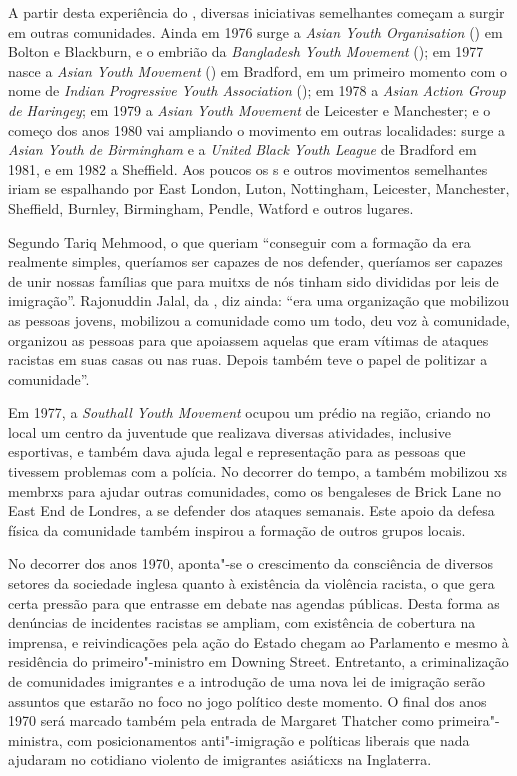 A partir desta experiência do , diversas iniciativas semelhantes começam a surgir em outras comunidades. Ainda em 1976 surge a \emph{Asian Youth Organisation} () em Bolton e Blackburn, e o embrião da \emph{Bangladesh Youth Movement} (); em 1977 nasce a \emph{Asian Youth Movement} () em Bradford, em um primeiro momento com o nome de \emph{Indian Progressive Youth Association} (); em 1978 a \emph{Asian Action Group de Haringey}; em 1979 a \emph{Asian Youth Movement} de Leicester e Manchester; e o começo dos anos 1980 vai ampliando o movimento em outras localidades: surge a \emph{Asian Youth de Birmingham} e a \emph{United Black Youth League} de Bradford em 1981, e em 1982 a  Sheffield. Aos poucos os s e outros movimentos semelhantes iriam se espalhando por East London, Luton, Nottingham, Leicester, Manchester, Sheffield, Burnley, Birmingham, Pendle, Watford e outros lugares.

Segundo Tariq Mehmood, o que queriam ``conseguir com a formação da  era realmente simples, queríamos ser capazes de nos defender, queríamos ser capazes de unir nossas famílias que para muitxs de nós tinham sido divididas por leis de imigração''. Rajonuddin Jalal, da , diz ainda: ``era uma organização que mobilizou as pessoas jovens, mobilizou a comunidade como um todo, deu voz à comunidade, organizou as pessoas para que apoiassem aquelas que eram vítimas de ataques racistas em suas casas ou nas ruas. Depois também teve o papel de politizar a comunidade''.

Em 1977, a \emph{Southall Youth Movement} ocupou um prédio na região, criando no local um centro da juventude que realizava diversas atividades, inclusive esportivas, e também dava ajuda legal e representação para as pessoas que tivessem problemas com a polícia. No decorrer do tempo, a  também mobilizou xs membrxs para ajudar outras comunidades, como os bengaleses de Brick Lane no East End de Londres, a se defender dos ataques semanais. Este apoio da defesa física da comunidade também inspirou a formação de outros grupos locais.

No decorrer dos anos 1970, aponta"-se o crescimento da consciência de diversos setores da sociedade inglesa quanto à existência da violência racista, o que gera certa pressão para que entrasse em debate nas agendas públicas. Desta forma as denúncias de incidentes racistas se ampliam, com existência de cobertura na imprensa, e reivindicações pela ação do Estado chegam ao Parlamento e mesmo à residência do primeiro"-ministro em Downing Street. Entretanto, a criminalização de comunidades imigrantes e a introdução de uma nova lei de imigração serão assuntos que estarão no foco no jogo político deste momento. O final dos anos 1970 será marcado também pela entrada de Margaret Thatcher como primeira"-ministra, com posicionamentos anti"-imigração e políticas liberais que nada ajudaram no cotidiano violento de imigrantes asiáticxs na Inglaterra.

